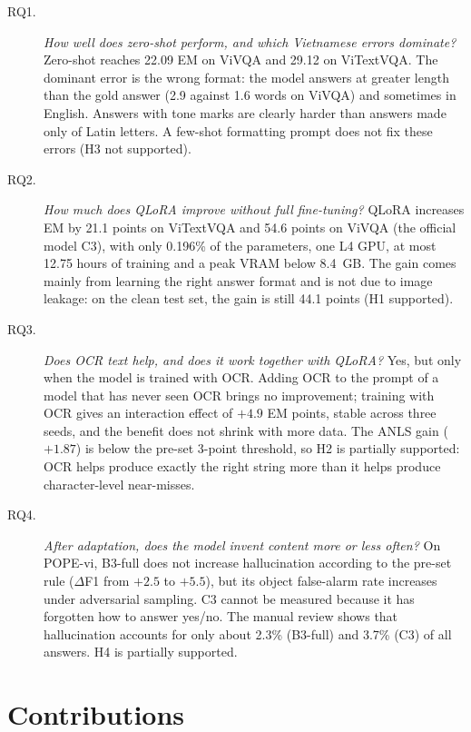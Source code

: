 \begin{description}
  \item[RQ1.] \textit{How well does zero-shot perform, and which Vietnamese errors dominate?}
  Zero-shot reaches 22.09 EM on ViVQA and 29.12 on ViTextVQA. The dominant error is the wrong
  format: the model answers at greater length than the gold answer (2.9 against 1.6 words on
  ViVQA) and sometimes in English. Answers with tone marks are clearly harder than answers
  made only of Latin letters. A few-shot formatting prompt does not fix these errors (H3 not
  supported).

  \item[RQ2.] \textit{How much does QLoRA improve without full fine-tuning?}
  QLoRA increases EM by 21.1 points on ViTextVQA and 54.6 points on ViVQA (the official model
  C3), with only 0.196\% of the parameters, one L4 GPU, at most 12.75 hours of training and a
  peak VRAM below 8.4~GB. The gain comes mainly from learning the right answer format and is
  not due to image leakage: on the clean test set, the gain is still 44.1 points (H1
  supported).

  \item[RQ3.] \textit{Does OCR text help, and does it work together with QLoRA?}
  Yes, but only when the model is trained with OCR. Adding OCR to the prompt of a model that
  has never seen OCR brings no improvement; training with OCR gives an interaction effect of
  $+4.9$ EM points, stable across three seeds, and the benefit does not shrink with more data.
  The ANLS gain ($+1.87$) is below the pre-set 3-point threshold, so H2 is partially
  supported: OCR helps produce exactly the right string more than it helps produce
  character-level near-misses.

  \item[RQ4.] \textit{After adaptation, does the model invent content more or less often?}
  On POPE-vi, B3-full does not increase hallucination according to the pre-set rule
  ($\Delta$F1 from $+2.5$ to $+5.5$), but its object false-alarm rate increases under
  adversarial sampling. C3 cannot be measured because it has forgotten how to answer yes/no.
  The manual review shows that hallucination accounts for only about 2.3\% (B3-full) and 3.7\%
  (C3) of all answers. H4 is partially supported.
\end{description}

\section{Contributions}
\label{sec:con-contrib}


